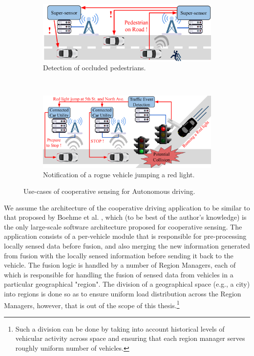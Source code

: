 \begin{figure}[t!]
    \centering
    \begin{subfigure}[t]{0.45\textwidth}
        \centering
        \includegraphics[width=\textwidth]{figures/apps/pedestrian}
        \caption{Detection of occluded pedestrians.}
        \label{fig:pedestrian}
    \end{subfigure}%
    ~ 
    \begin{subfigure}[t]{0.45\textwidth}
        \centering
        \includegraphics[width=\textwidth]{figures/apps/redlight}
        \caption{Notification of a rogue vehicle jumping a red light.}
        \label{fig:redlight}
    \end{subfigure}
    \caption{Use-cases of cooperative sensing for Autonomous driving.}
\end{figure}
\par We assume the architecture of the cooperative driving application to be similar to that proposed by Boehme et al. \cite{talkycars}, which (to be best of the author's knowledge) is the only large-scale software architecture proposed for cooperative sensing. The application consists of a per-vehicle module that is responsible for pre-processing locally sensed data before fusion, and also merging the new information generated from fusion with the locally sensed information before sending it back to the vehicle. The fusion logic is handled by a number of Region Managers, each of which is responsible for handling the fusion of sensed data from vehicles in a particular geographical "region". The division of a geographical space (e.g., a city) into regions is done so as to ensure uniform load distribution across the Region Managers, however, that is out of the scope of this thesis.\footnote{Such a division can be done by taking into account historical levels of vehicular activity across space and ensuring that each region manager serves roughly uniform number of vehicles.}

